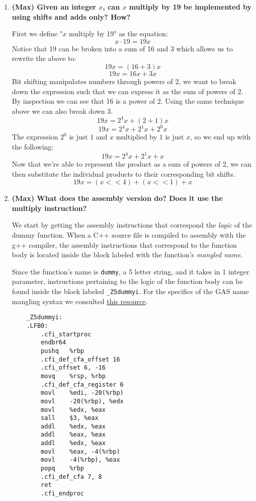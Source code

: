 \documentclass{article}
\begin{document}
\begin{enumerate}
    \item \textbf{(Max) Given an integer \( x \), can \( x \) multiply by 19 be implemented by using shifts and adds only? How?}
    
    First we define "\( x \) multiply by 19" as the equation:
    \[
    x \cdot 19 = 19x
    \]
    Notice that 19 can be broken into a sum of 16 and 3 which allows us to rewrite the above to:
    \[
    19x = (16+3)x 
    \]
    \[
    19x = 16x + 3x
    \]
    Bit shifting manipulates numbers through powers of 2, we want to break down the expression such that we
    can express it as the sum of powers of 2. By inspection we can see that 16 is a power of 2. Using the same
    technique above we can also break down 3.
    \[
    19x = 2^4x + (2+1)x
    \]
    \[
    19x = 2^4x + 2^1x + 2^0x
    \]
    The expression \(2^0\) is just \(1\) and \(x\) multiplied by \(1\) is just \(x\), so we end up with the following:
    \[
    19x = 2^4x + 2^1x + x
    \]
    Now that we're able to represent the product as a sum of powers of 2, we can then substitute the individual products
    to their corresponding bit shifts.
    \[
    19x = (x << 4) + (x << 1) + x
    \]

    \item \textbf{(Max) What does the assembly version do? Does it use the multiply instruction?}
    
    We start by getting the assembly instructions that correspond the \emph{logic} of the dummy function.
    When a C++ source file is compiled to assembly with the g++ compiler, the assembly instructions that
    correspond to the function body is located inside the block labeled with the function's \emph{mangled name}.

    Since the function's name is \texttt{dummy}, a 5 letter string, and it takes in 1 integer parameter, instructions pertaining
    to the logic of the function body can be found inside the block labeled \texttt{\_Z5dummyi}. For the specifics of the
    GAS name mangling syntax we consulted \href{http://web.mit.edu/tibbetts/Public/inside-c/www/mangling.html}{this resource}.

    \begin{verbatim}
    _Z5dummyi:
    .LFB0:
        .cfi_startproc
        endbr64
        pushq	%rbp
        .cfi_def_cfa_offset 16
        .cfi_offset 6, -16
        movq	%rsp, %rbp
        .cfi_def_cfa_register 6
        movl	%edi, -20(%rbp)
        movl	-20(%rbp), %edx
        movl	%edx, %eax
        sall	$3, %eax
        addl	%edx, %eax
        addl	%eax, %eax
        addl	%edx, %eax
        movl	%eax, -4(%rbp)
        movl	-4(%rbp), %eax
        popq	%rbp
        .cfi_def_cfa 7, 8
        ret
        .cfi_endproc
    \end{verbatim}


\end{enumerate}
\end{document}
